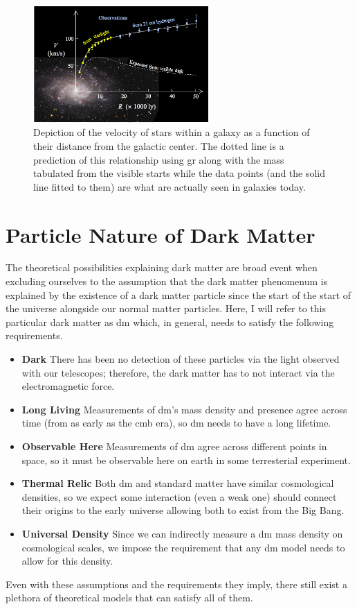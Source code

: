 \begin{figure}
    \centering
    \includegraphics[width=0.6\textwidth]{figures/theory/rotation-curve-evidence-for-dm.png}
    \caption{
        Depiction of the velocity of stars within a galaxy as a function of their distance
        from the galactic center. The dotted line is a prediction of this relationship using
        \gls{gr} along with the mass tabulated from the visible starts while the data points
        (and the solid line fitted to them) are what are actually seen in galaxies today.
    }
    \label{fig:rotation-curve}
\end{figure}

\section{Particle Nature of Dark Matter}
The theoretical possibilities explaining dark matter are broad \cite{darksectors-2016}
event when excluding ourselves to the assumption that the dark matter phenomenum is explained
by the existence of a dark matter particle since the start of the start of the universe alongside
our normal matter particles. Here, I will refer to this particular dark matter
as \gls{dm} which, in general, needs to satisfy the following requirements.
\begin{itemize}
    \item \textbf{Dark} There has been no detection of these particles via the light observed with our telescopes;
          therefore, the dark matter has to not interact via the electromagnetic force.
    \item \textbf{Long Living} Measurements of \gls{dm}'s mass density and presence agree across time
          (from as early as the \gls{cmb} era), so \gls{dm} needs to have a long lifetime.
    \item \textbf{Observable Here} Measurements of \gls{dm} agree across different points in space,
          so it must be observable here on earth in some terresterial experiment.
    \item \textbf{Thermal Relic} Both \gls{dm} and standard matter have similar
          cosmological densities, so we expect some interaction (even a weak one) should connect their
          origins to the early universe allowing both to exist from the Big Bang.
    \item \textbf{Universal Density} Since we can indirectly measure a \gls{dm} mass density on
          cosmological scales, we impose the requirement that any \gls{dm} model needs to allow for
          this density.
\end{itemize}
Even with these assumptions and the requirements they imply, there still exist a plethora of
theoretical models that can satisfy all of them.

